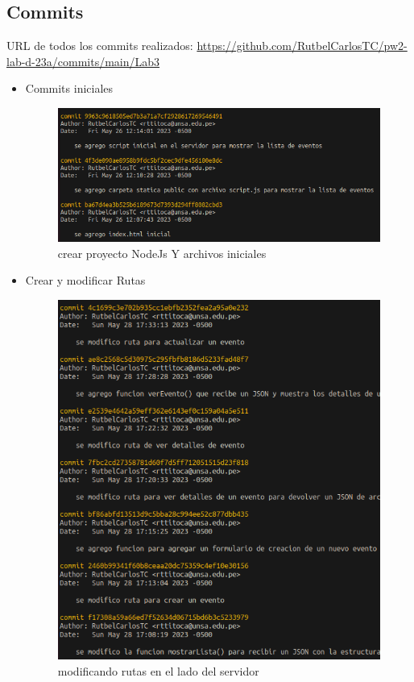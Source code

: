 \documentclass{article}
\begin{document}
\subsection{Commits}
URL de todos los commits realizados: \url{https://github.com/RutbelCarlosTC/pw2-lab-d-23a/commits/main/Lab3}
\begin{itemize}
    \item Commits iniciales
    \begin{figure}[H]
        \centering
        \includegraphics[scale=0.5]{img/commits/commits-iniciales.png}
        \caption{crear proyecto NodeJs Y archivos iniciales}
    \end{figure}

    \item Crear y modificar Rutas   
    \begin{figure}[H]
        \centering
        \includegraphics[scale=0.5]{img/commits/commits-modificar-Rutas y eventos.png}
        \caption{modificando rutas en el lado del servidor}
    \end{figure}


\end{itemize}
\end{document}
